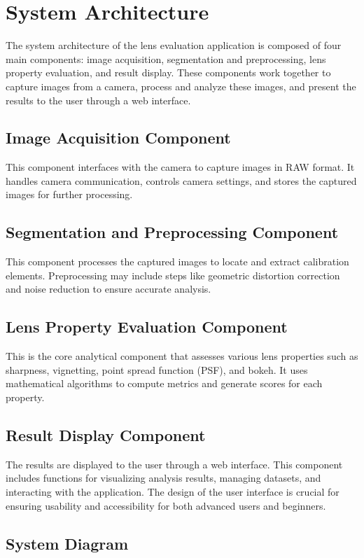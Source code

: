 \section{System Architecture}

The system architecture of the lens evaluation application is composed of four main components: image acquisition, segmentation and preprocessing, lens property evaluation, and result display. These components work together to capture images from a camera, process and analyze these images, and present the results to the user through a web interface.

\subsection{Image Acquisition Component}
This component interfaces with the camera to capture images in RAW format. It handles camera communication, controls camera settings, and stores the captured images for further processing.

\subsection{Segmentation and Preprocessing Component}
This component processes the captured images to locate and extract calibration elements. Preprocessing may include steps like geometric distortion correction and noise reduction to ensure accurate analysis.

\subsection{Lens Property Evaluation Component}
This is the core analytical component that assesses various lens properties such as sharpness, vignetting, point spread function (PSF), and bokeh. It uses mathematical algorithms to compute metrics and generate scores for each property.

\subsection{Result Display Component}
The results are displayed to the user through a web interface. This component includes functions for visualizing analysis results, managing datasets, and interacting with the application. The design of the user interface is crucial for ensuring usability and accessibility for both advanced users and beginners.

\subsection{System Diagram}

